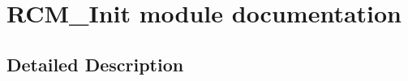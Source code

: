 \hypertarget{group___r_c_m___init__module}{}\section{R\+C\+M\+\_\+\+Init module documentation}
\label{group___r_c_m___init__module}


\subsection{Detailed Description}
